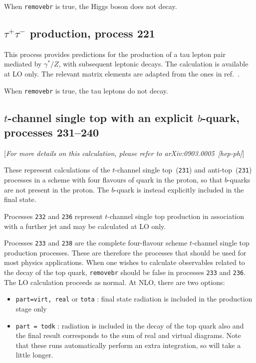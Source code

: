 \documentclass[12pt]{article}
\begin{document}
When {\tt removebr} is true, the Higgs boson does not decay.

\subsection{$\tau^+\tau^-$ production, process 221}
\label{subsec:tautau}

This process provides predictions for the production of a tau lepton
pair mediated by $\gamma^*/Z$, with subsequent leptonic decays. The calculation is available at LO
only. The relevant matrix elements are adapted from the ones in
ref.~\cite{Kleiss:1988xr}.

When {\tt removebr} is true, the tau leptons do not decay.

\subsection{$t$-channel single top with an explicit $b$-quark, processes 231--240}
\label{subsec:stopb}

\begin{center}
[{\it For more details on this calculation, please refer to arXiv:0903.0005~[hep-ph]}]
\end{center}

These represent calculations of the $t$-channel single top~({\tt 231}) and anti-top~({\tt 231})
processes in a scheme with four flavours of quark in the proton, so that $b$-quarks are not present in the proton.
The $b$-quark is instead explicitly included in the final state.

Processes {\tt 232} and {\tt 236} represent $t$-channel single top production in association
with a further jet and may be calculated at LO only.

Processes {\tt 233} and {\tt 238} are the complete four-flavour scheme $t$-channel single top production processes.
These are therefore the processes that should be used for most physics applications.
When one wishes to calculate observables related to the decay of the top
quark, {\tt removebr} should be false in processes {\tt 233} and {\tt 236}.
The LO calculation proceeds as normal. At NLO, there are two options:
\begin{itemize}
\item {\tt part=virt, real} or {\tt tota} : final state radiation is included
in the production stage only
\item {\tt part = todk} : radiation is included in the decay of the top
quark also and the final result corresponds to the sum of real and virtual
diagrams. 
Note that these runs automatically perform an extra integration, so
will take a little longer.
\end{itemize}
\end{document}
